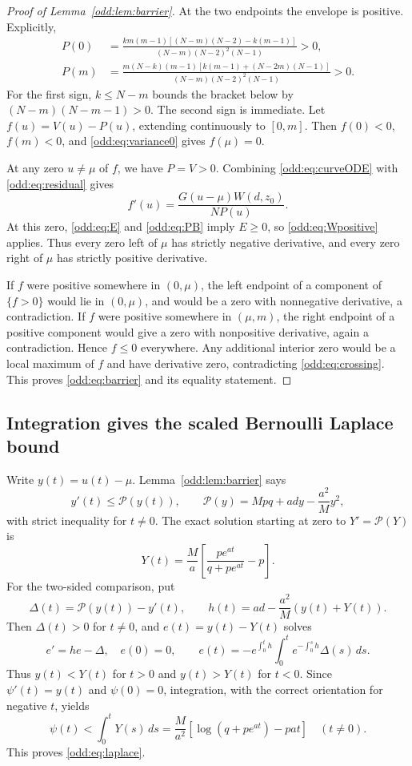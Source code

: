 \documentclass[11pt,a4paper]{article}
\begin{document}
\begin{proof}[Proof of Lemma~\ref{odd:lem:barrier}]
At the two endpoints the envelope is positive. Explicitly,
\begin{align}
 P(0)&=\frac{km(m-1)[(N-m)(N-2)-k(m-1)]}
 {(N-m)(N-2)^2(N-1)}>0,\label{odd:eq:end0}\\
 P(m)&=\frac{m(N-k)(m-1)[k(m-1)+(N-2m)(N-1)]}
 {(N-m)(N-2)^2(N-1)}>0.\label{odd:eq:endm}
\end{align}
For the first sign, $k\le N-m$ bounds the bracket below by
$(N-m)(N-m-1)>0$. The second sign is immediate.
Let $f(u)=V(u)-P(u)$, extending continuously to $[0,m]$.
Then $f(0)<0$, $f(m)<0$, and \eqref{odd:eq:variance0} gives $f(\mu)=0$.

At any zero $u\ne\mu$ of $f$, we have $P=V>0$. Combining
\eqref{odd:eq:curveODE} with \eqref{odd:eq:residual} gives
\begin{equation}\label{odd:eq:crossing}
 f'(u)=\frac{G(u-\mu)W(d,z_0)}{NP(u)}.
\end{equation}
At this zero, \eqref{odd:eq:E} and \eqref{odd:eq:PB} imply $E\ge0$, so
\eqref{odd:eq:Wpositive} applies. Thus every zero left of $\mu$ has strictly negative derivative, and every zero right of $\mu$ has strictly positive derivative.

If $f$ were positive somewhere in $(0,\mu)$, the left endpoint of a component of $\{f>0\}$ would lie in $(0,\mu)$, and would be a zero with nonnegative derivative, a contradiction. If $f$ were positive somewhere in $(\mu,m)$, the right endpoint of a positive component would give a zero with nonpositive derivative, again a contradiction. Hence $f\le0$ everywhere. Any additional interior zero would be a local maximum of $f$ and have derivative zero, contradicting \eqref{odd:eq:crossing}. This proves \eqref{odd:eq:barrier} and its equality statement.
\end{proof}

\subsection{Integration gives the scaled Bernoulli Laplace bound}
Write $y(t)=u(t)-\mu$. Lemma~\ref{odd:lem:barrier} says
\[
 y'(t)\le \mathcal P(y(t)),\qquad
 \mathcal P(y)=Mpq+ady-\frac{a^2}{M}y^2,
\]
with strict inequality for $t\ne0$. The exact solution starting at zero to
$Y'=\mathcal P(Y)$ is
\begin{equation}\label{odd:eq:Y}
 Y(t)=\frac{M}{a}\left[\frac{pe^{at}}{q+pe^{at}}-p\right].
\end{equation}
For the two-sided comparison, put
\[
 \Delta(t)=\mathcal P(y(t))-y'(t),\qquad
 h(t)=ad-\frac{a^2}{M}(y(t)+Y(t)).
\]
Then $\Delta(t)>0$ for $t\ne0$, and $e(t)=y(t)-Y(t)$ solves
\[
 e'=he-\Delta,\quad e(0)=0,\qquad
 e(t)=-e^{\int_0^t h}\int_0^t e^{-\int_0^s h}\Delta(s)\,ds.
\]
Thus $y(t)<Y(t)$ for $t>0$ and $y(t)>Y(t)$ for $t<0$.
Since $\psi'(t)=y(t)$ and $\psi(0)=0$, integration, with the correct orientation for negative $t$, yields
\[
 \psi(t)<\int_0^tY(s)\,ds
 =\frac{M}{a^2}[\log(q+pe^{at})-pat]\quad(t\ne0).
\]
This proves \eqref{odd:eq:laplace}.
\end{document}

